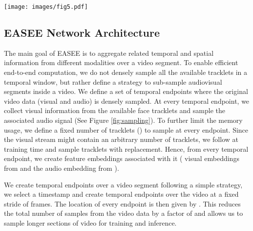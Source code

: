 \documentclass[10pt,twocolumn,letterpaper]{article}
\begin{document}
 \begin{figure*}[t]
    \begin{center}
        \texttt{[image: images/fig5.pdf]}
    \end{center}
    \caption{ 
        \textbf{EASEE Sub-Sampling.} For every temporal endpoint, we sample  face tracklets and the corresponding audio signal. This sampling is repeated over  consecutive temporal endpoints separated by stride . The  feature embeddings obtained at each timestamp are forwarded through the audio (yellow) and visual (light green) encoders fused into the spatio-temporal embedding .
    }
    \label{fig:sampling}
\end{figure*} 
\subsection{EASEE Network Architecture} 
\label{subsec:Architecture}

The main goal of EASEE is to aggregate related temporal and spatial information from different modalities over a video segment. To enable efficient end-to-end computation, we do not densely sample  all the available tracklets in a temporal window, but rather define a strategy to sub-sample audiovisual segments inside a video. We define a set of temporal endpoints where the original video data (visual and audio) is densely sampled. At every temporal endpoint, we collect visual information from the available face tracklets and sample the associated audio signal  (See Figure \ref{fig:sampling}). To further limit the memory usage, we define a fixed number of tracklets () to sample at every endpoint. Since the visual stream might contain an arbitrary number of tracklets, we follow \cite{alcazar2020active} at training time and sample  tracklets with replacement. Hence, from every temporal endpoint, we create  feature embeddings associated with it ( visual embeddings from  and the audio embedding from ). 

We create temporal endpoints over a video segment following a simple strategy, we select a timestamp  and create  temporal endpoints over the video at a fixed stride of  frames. The location of every endpoint is then given by . This reduces the total number of samples from the video data by a factor of  and allows us to sample longer sections of video for training and inference. 
\end{document}
